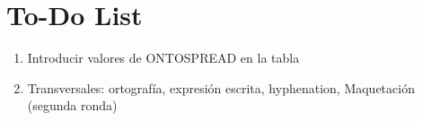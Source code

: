 \chapter*{To-Do List}
\begin{enumerate}
 \item Introducir valores de ONTOSPREAD en la tabla
 \item Transversales: ortografía, expresión escrita, hyphenation, Maquetación (segunda ronda)
\end{enumerate}
